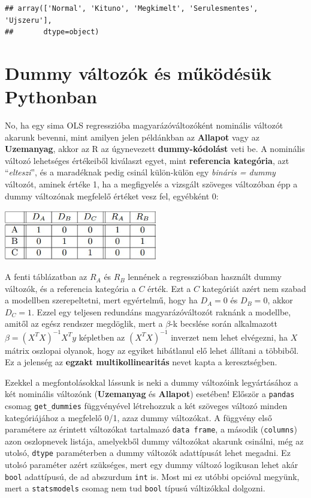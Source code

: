 \documentclass[
]{book}
\begin{document}
\begin{verbatim}
## array(['Normal', 'Kituno', 'Megkimelt', 'Serulesmentes', 'Ujszeru'],
##       dtype=object)
\end{verbatim}

\section{Dummy változók és működésük Pythonban}\label{dummy-vuxe1ltozuxf3k-uxe9s-mux171kuxf6duxe9suxfck-pythonban}

No, ha egy sima OLS regresszióba magyarázóváltozóként nominális változót akarunk bevenni, mint amilyen jelen példánkban az \textbf{Allapot} vagy az \textbf{Uzemanyag}, akkor az R az úgynevezett \textbf{dummy-kódolást} veti be. A nominális változó lehetséges értékeiből kiválaszt egyet, mint \textbf{referencia kategória}, azt ``\emph{elteszi}'', és a maradéknak pedig csinál külön-külön egy \emph{bináris = dummy} változót, aminek értéke 1, ha a megfigyelés a vizsgált szöveges változóban épp a dummy változónak megfelelő értéket vesz fel, egyébként 0:

\includegraphics[width=0.5\textwidth,height=\textheight]{Dummy.jpg}

A fenti táblázatban az \(R_A\) és \(R_B\) lennének a regresszióban használt dummy változók, és a referencia kategória a \(C\) érték. Ezt a \(C\) kategóriát azért nem szabad a modellben szerepeltetni, mert egyértelmű, hogy ha \(D_A=0\) és \(D_B=0\), akkor \(D_C=1\). Ezzel egy teljesen redundáns magyarázóváltozót raknánk a modellbe, amitől az egész rendszer megdöglik, mert a \(\beta\)-k becslése során alkalmazott \(\beta=(X^TX)^{-1}X^Ty\) képletben az \((X^TX)^{-1}\) inverzet nem lehet elvégezni, ha \(X\) mátrix oszlopai olyanok, hogy az egyiket hibátlanul elő lehet állítani a többiből. Ez a jelenség az \textbf{egzakt multikollinearitás} nevet kapta a keresztségben.

Ezekkel a megfontolásokkal lássunk is neki a dummy változóink legyártásához a két nominális változónk (\textbf{Uzemanyag} és \textbf{Allapot}) esetében!
Először a \texttt{pandas} csomag \texttt{get\_dummies} függvényével létrehozzuk a két szöveges változó minden kategóriájához a megfelelő 0/1, azaz dummy változókat. A függvény első paramétere az érintett változókat tartalmazó \texttt{data\ frame}, a második (\texttt{columns}) azon oszlopnevek listája, amelyekből dummy változókat akarunk csinálni, még az utolsó, \texttt{dtype} paraméterben a dummy változók adattípusát lehet megadni. Ez utolsó paraméter azért szükséges, mert egy dummy változó logikusan lehet akár \texttt{bool} adattípusú, de ad abszurdum \texttt{int} is. Most mi ez utóbbi opcióval megyünk, mert a \texttt{statsmodels} csomag nem tud \texttt{bool} típusú váltizókkal dolgozni.
\end{document}
